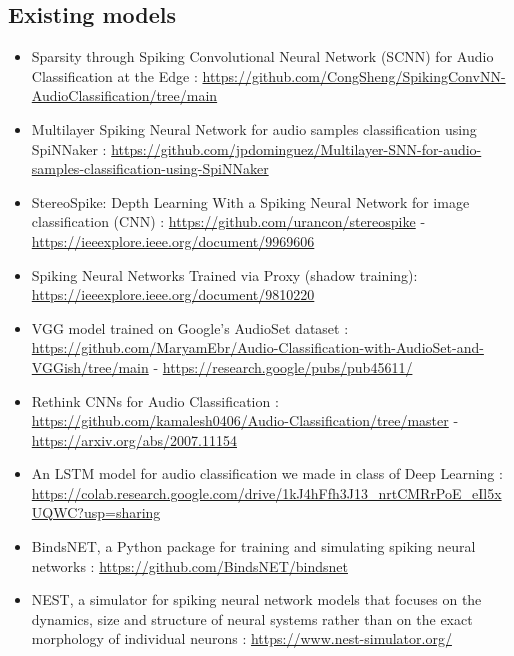 \documentclass[11pt]{article}
\begin{document}
\subsection{Existing models}

\begin{itemize}
  \item Sparsity through Spiking Convolutional Neural Network (SCNN) for Audio Classification at the Edge : \url{https://github.com/CongSheng/SpikingConvNN-AudioClassification/tree/main}
        \label{item:SCNN-audio-classification}
  \item Multilayer Spiking Neural Network for audio samples classification using SpiNNaker : \url{https://github.com/jpdominguez/Multilayer-SNN-for-audio-samples-classification-using-SpiNNaker}
        \label{item:spinnaker-audio-classification}

  \item StereoSpike: Depth Learning With a Spiking Neural Network for image classification (CNN) : \url{https://github.com/urancon/stereospike} - \url{https://ieeexplore.ieee.org/document/9969606} \label{item:stereospike}

  \item Spiking Neural Networks Trained via Proxy (shadow training): \url{https://ieeexplore.ieee.org/document/9810220} \label{item:shadow-training}

  \item VGG model trained on Google's AudioSet dataset : \url{https://github.com/MaryamEbr/Audio-Classification-with-AudioSet-and-VGGish/tree/main} \label{item:vgg-audioset_audioset} - \url{https://research.google/pubs/pub45611/}

  \item  Rethink CNNs for Audio Classification : \url{https://github.com/kamalesh0406/Audio-Classification/tree/master} - \url{https://arxiv.org/abs/2007.11154} \label{rethink-CNN-for-audio-classification}

  \item An LSTM model for audio classification we made in class of Deep Learning : \url{https://colab.research.google.com/drive/1kJ4hFfh3J13_nrtCMRrPoE_eIl5xUQWC?usp=sharing} \label{item:lstm-audio-classification}

  \item BindsNET, a Python package for training and simulating spiking neural networks : \url{https://github.com/BindsNET/bindsnet} \label{item:bindsNET_snntorch-lib}

  \item NEST, a simulator for spiking neural network models that focuses on the dynamics, size and structure of neural systems rather than on the exact morphology of individual neurons : \url{https://www.nest-simulator.org/} \label{item:nest_snntorch-lib}

\end{itemize}
\end{document}
